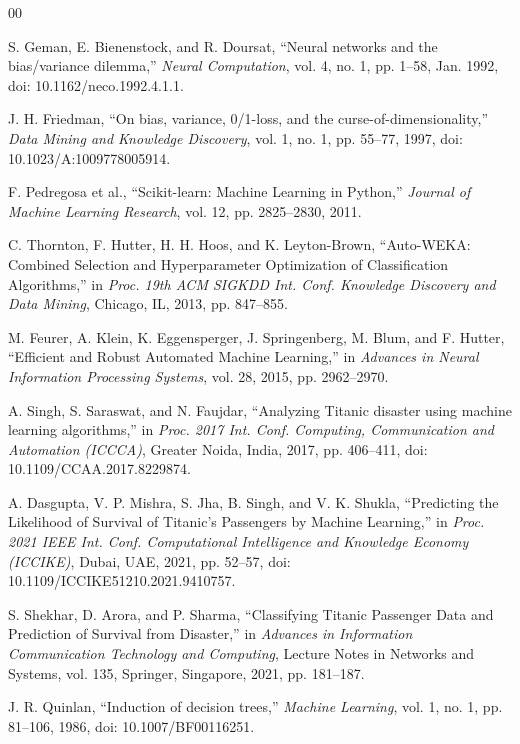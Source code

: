 \documentclass[conference]{IEEEtran}
\begin{document}
\begin{thebibliography}{00}

 S. Geman, E. Bienenstock, and R. Doursat, ``Neural networks and the bias/variance dilemma,'' \textit{Neural Computation}, vol. 4, no. 1, pp. 1--58, Jan. 1992, doi: 10.1162/neco.1992.4.1.1.

 J. H. Friedman, ``On bias, variance, 0/1-loss, and the curse-of-dimensionality,'' \textit{Data Mining and Knowledge Discovery}, vol. 1, no. 1, pp. 55--77, 1997, doi: 10.1023/A:1009778005914.

 F. Pedregosa et al., ``Scikit-learn: Machine Learning in Python,'' \textit{Journal of Machine Learning Research}, vol. 12, pp. 2825--2830, 2011.

 C. Thornton, F. Hutter, H. H. Hoos, and K. Leyton-Brown, ``Auto-WEKA: Combined Selection and Hyperparameter Optimization of Classification Algorithms,'' in \textit{Proc. 19th ACM SIGKDD Int. Conf. Knowledge Discovery and Data Mining}, Chicago, IL, 2013, pp. 847--855.

 M. Feurer, A. Klein, K. Eggensperger, J. Springenberg, M. Blum, and F. Hutter, ``Efficient and Robust Automated Machine Learning,'' in \textit{Advances in Neural Information Processing Systems}, vol. 28, 2015, pp. 2962--2970.

 A. Singh, S. Saraswat, and N. Faujdar, ``Analyzing Titanic disaster using machine learning algorithms,'' in \textit{Proc. 2017 Int. Conf. Computing, Communication and Automation (ICCCA)}, Greater Noida, India, 2017, pp. 406--411, doi: 10.1109/CCAA.2017.8229874.

 A. Dasgupta, V. P. Mishra, S. Jha, B. Singh, and V. K. Shukla, ``Predicting the Likelihood of Survival of Titanic's Passengers by Machine Learning,'' in \textit{Proc. 2021 IEEE Int. Conf. Computational Intelligence and Knowledge Economy (ICCIKE)}, Dubai, UAE, 2021, pp. 52--57, doi: 10.1109/ICCIKE51210.2021.9410757.

 S. Shekhar, D. Arora, and P. Sharma, ``Classifying Titanic Passenger Data and Prediction of Survival from Disaster,'' in \textit{Advances in Information Communication Technology and Computing}, Lecture Notes in Networks and Systems, vol. 135, Springer, Singapore, 2021, pp. 181--187.

 J. R. Quinlan, ``Induction of decision trees,'' \textit{Machine Learning}, vol. 1, no. 1, pp. 81--106, 1986, doi: 10.1007/BF00116251.


\end{thebibliography}
\end{document}
